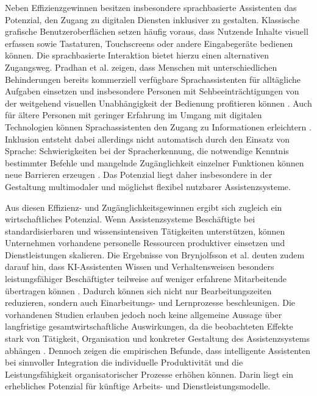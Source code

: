 Neben Effizienzgewinnen besitzen insbesondere sprachbasierte Assistenten das Potenzial, den Zugang zu digitalen Diensten inklusiver zu gestalten. Klassische grafische Benutzeroberflächen setzen häufig voraus, dass Nutzende Inhalte visuell erfassen sowie Tastaturen, Touchscreens oder andere Eingabegeräte bedienen können. Die sprachbasierte Interaktion bietet hierzu einen alternativen Zugangsweg. Pradhan et al. zeigen, dass Menschen mit unterschiedlichen Behinderungen bereits kommerziell verfügbare Sprachassistenten für alltägliche Aufgaben einsetzen und insbesondere Personen mit Sehbeeinträchtigungen von der weitgehend visuellen Unabhängigkeit der Bedienung profitieren können \cite{pradhan2018accessibility}. Auch für ältere Personen mit geringer Erfahrung im Umgang mit digitalen Technologien können Sprachassistenten den Zugang zu Informationen erleichtern \cite{pradhan2020older}. Inklusion entsteht dabei allerdings nicht automatisch durch den Einsatz von Sprache: Schwierigkeiten bei der Spracherkennung, die notwendige Kenntnis bestimmter Befehle und mangelnde Zugänglichkeit einzelner Funktionen können neue Barrieren erzeugen \cite{pradhan2018accessibility,pradhan2020older}. Das Potenzial liegt daher insbesondere in der Gestaltung multimodaler und möglichst flexibel nutzbarer Assistenzsysteme.

Aus diesen Effizienz- und Zugänglichkeitsgewinnen ergibt sich zugleich ein wirtschaftliches Potenzial. Wenn Assistenzsysteme Beschäftigte bei standardisierbaren und wissensintensiven Tätigkeiten unterstützen, können Unternehmen vorhandene personelle Ressourcen produktiver einsetzen und Dienstleistungen skalieren. Die Ergebnisse von Brynjolfsson et al. deuten zudem darauf hin, dass KI-Assistenten Wissen und Verhaltensweisen besonders leistungsfähiger Beschäftigter teilweise auf weniger erfahrene Mitarbeitende übertragen können \cite{brynjolfsson2025generative}. Dadurch können sich nicht nur Bearbeitungszeiten reduzieren, sondern auch Einarbeitungs- und Lernprozesse beschleunigen. Die vorhandenen Studien erlauben jedoch noch keine allgemeine Aussage über langfristige gesamtwirtschaftliche Auswirkungen, da die beobachteten Effekte stark von Tätigkeit, Organisation und konkreter Gestaltung des Assistenzsystems abhängen \cite{brynjolfsson2025generative}. Dennoch zeigen die empirischen Befunde, dass intelligente Assistenten bei sinnvoller Integration die individuelle Produktivität und die Leistungsfähigkeit organisatorischer Prozesse erhöhen können. Darin liegt ein erhebliches Potenzial für künftige Arbeits- und Dienstleistungsmodelle.
